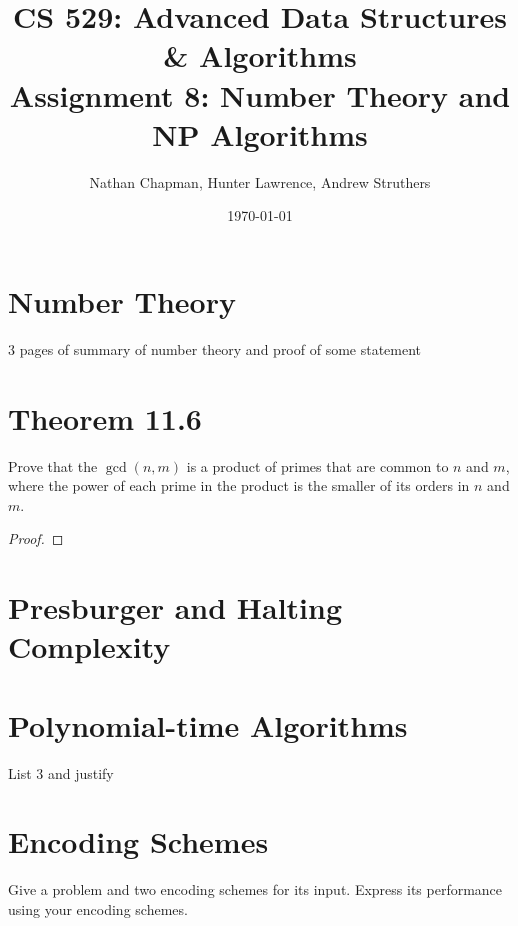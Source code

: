 \documentclass{article}
\title{\vspace*{-0.625in}CS 529: Advanced Data Structures \& Algorithms \\ Assignment 8: Number Theory and NP Algorithms}
\author{Nathan Chapman, Hunter Lawrence, Andrew Struthers}
\date{\today}
\renewcommand{\_}{\ifincsname_\else\legacyunderscore\fi}
\begin{document}
\maketitle

\section*{Number Theory}

    3 pages of summary of number theory and proof of some statement

\section*{Theorem 11.6}

    Prove that the $\gcd(n, m)$ is a product of primes that are common to $n$ and $m$, where the power of each prime in the product is the smaller of its orders in $n$ and $m$.

    \begin{proof}
        
    \end{proof}

\section*{Presburger and Halting Complexity}

\section*{Polynomial-time Algorithms}

    List 3 and justify

\section*{Encoding Schemes}

    Give a problem and two encoding schemes for its input.  Express its performance using your encoding schemes.
\end{document}
